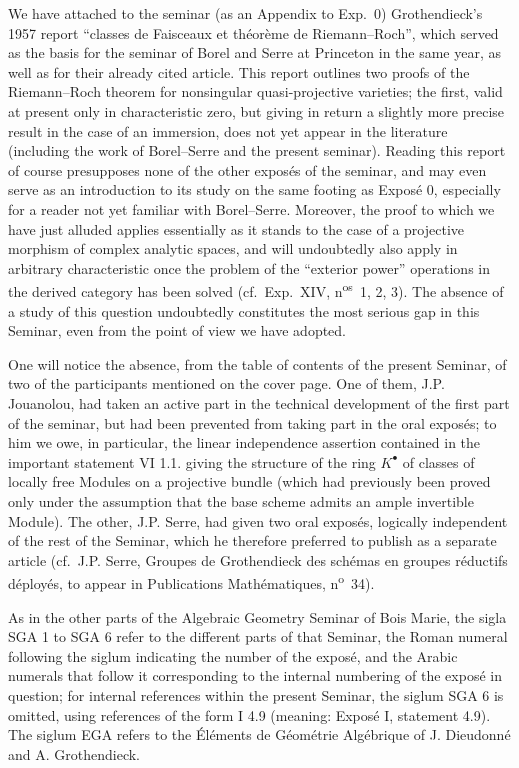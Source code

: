 We have attached to the seminar (as an Appendix to Exp.\ 0) Grothendieck's 1957 report ``classes de Faisceaux et théorème de Riemann--Roch'', which served as the basis for the seminar of Borel and Serre at Princeton in the same year, as well as for their already cited article. This report outlines two proofs of the Riemann--Roch theorem for nonsingular quasi-projective varieties; the first, valid at present only in characteristic zero, but giving in return a slightly more precise result in the case of an immersion, does not yet appear in the literature (including the work of Borel--Serre and the present seminar). Reading this report of course presupposes none of the other exposés of the seminar, and may even serve as an introduction to its study on the same footing as Exposé 0, especially for a reader not yet familiar with Borel--Serre. Moreover, the proof to which we have just alluded applies essentially as it stands to the case
%
of a projective morphism of complex analytic spaces, and will undoubtedly also apply in arbitrary characteristic once the problem of the ``exterior power'' operations in the derived category has been solved (cf.\ Exp.\ XIV, n\textsuperscript{os}~1, 2, 3). The absence of a study of this question undoubtedly constitutes the most serious gap in this Seminar, even from the point of view we have adopted.

One will notice the absence, from the table of contents of the present Seminar, of two of the participants mentioned on the cover page. One of them, J.P. Jouanolou, had taken an active part in the technical development of the first part of the seminar, but had been prevented from taking part in the oral exposés; to him we owe, in particular, the linear independence assertion contained in the important statement VI 1.1. giving the structure of the ring $K^{\bullet}$ of classes of locally free Modules on a projective bundle (which had previously been proved only under the assumption that the base scheme admits an ample invertible Module). The other, J.P. Serre, had given two oral exposés, logically independent of the rest of the Seminar, which he therefore preferred to publish as a separate article (cf.\ J.P. Serre, Groupes de Grothendieck des schémas en groupes réductifs déployés, to appear in Publications Mathématiques, n\textsuperscript{o}~34).

As in the other parts of the Algebraic Geometry Seminar of Bois Marie, the sigla SGA 1 to SGA 6 refer to the different parts of that Seminar, the Roman numeral following the siglum indicating the number of the exposé, and the Arabic numerals that follow it corresponding to the internal numbering of the exposé in question; for internal references within the present Seminar, the siglum SGA 6 is omitted, using references of the form I 4.9 (meaning: Exposé I, statement 4.9). The siglum EGA refers to the Éléments de Géométrie Algébrique of J. Dieudonné and A. Grothendieck.

